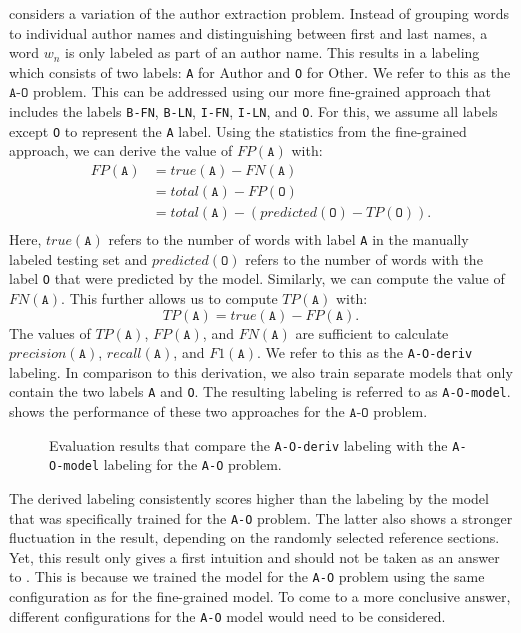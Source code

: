 \bigskip

 considers a variation of the author extraction problem.
Instead of grouping words to individual author names and distinguishing between first and last names, a word $w_n$ is only labeled as part of an author name.
This results in a labeling which consists of two labels:
\texttt{A} for Author and \texttt{O} for Other.
We refer to this as the $\texttt{A-O}$ problem.
This can be addressed using our more fine-grained approach that includes the labels \texttt{B-FN}, \texttt{B-LN}, \texttt{I-FN}, \texttt{I-LN}, and \texttt{O}.
For this, we assume all labels except \texttt{O} to represent the \texttt{A} label.
Using the statistics from the fine-grained approach, we can derive the value of $FP(\texttt{A})$ with:
\begin{equation*}
\begin{split}
  FP(\texttt{A})&=true(\texttt{A})-FN(\texttt{A})\\
  &=total(\texttt{A})-FP(\texttt{O})\\
  &=total(\texttt{A})-(predicted(\texttt{O})-TP(\texttt{O})).\\
\end{split}
\end{equation*}
Here, $true(\texttt{A})$ refers to the number of words with label \texttt{A} in the manually labeled testing set and $predicted(\texttt{O})$ refers to the number of words with the label \texttt{O} that were predicted by the model.
Similarly, we can compute the value of $FN(\texttt{A})$.
This further allows us to compute $TP(\texttt{A})$ with:
\begin{equation*}
  TP(\texttt{A})=true(\texttt{A})-FP(\texttt{A}).
\end{equation*}
The values of $TP(\texttt{A})$, $FP(\texttt{A})$, and $FN(\texttt{A})$ are sufficient to calculate $precision(\texttt{A})$, $recall(\texttt{A})$, and $F1(\texttt{A})$.
We refer to this as the \texttt{A-O-deriv} labeling.
In comparison to this derivation, we also train separate models that only contain the two labels \texttt{A} and \texttt{O}.
The resulting labeling is referred to as \texttt{A-O-model}.
 shows the performance of these two approaches for the $\texttt{A-O}$ problem.
\begin{figure}

\caption{Evaluation results that compare the \texttt{A-O-deriv} labeling with the \texttt{A-O-model} labeling for the \texttt{A-O} problem.}
\label{fig:eval-authors-only}
\end{figure}
The derived labeling consistently scores higher than the labeling by the model that was specifically trained for the \texttt{A-O} problem.
The latter also shows a stronger fluctuation in the result, depending on the randomly selected reference sections.
Yet, this result only gives a first intuition and should not be taken as an answer to .
This is because we trained the model for the \texttt{A-O} problem using the same configuration as for the fine-grained model.
To come to a more conclusive answer, different configurations for the \texttt{A-O} model would need to be considered.

